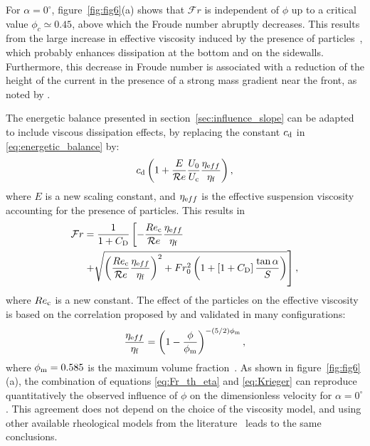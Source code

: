 \documentclass[12pt]{article}
\begin{document}
For $\alpha=0^\circ$, figure~\ref{fig:fig6}(a) shows that $\mathcal{F}r$ is independent of $\phi$ up to a critical value $\phi_{c} \simeq 0.45$, above which the Froude number abruptly decreases. This results from the large increase in effective viscosity induced by the presence of particles~\citep{stickel2005fluid}, which probably enhances dissipation at the bottom and on the sidewalls. Furthermore, this decrease in Froude number is associated with a reduction of the height of the current in the presence of a strong mass gradient near the front, as noted by \citet{Schneider2023}.


The energetic balance presented in section~\ref{sec:influence_slope} can be adapted to include viscous dissipation effects, by replacing the constant $c_{\text d}$ in \eqref{eq:energetic_balance} by:
\begin{equation}
	c_{\text d}\left(1 + \frac{E}{\mathcal{R}e}\frac{U_0}{U_{\text c}}\frac{\eta_{\text eff}}{\eta_{\text f}} \right),
\end{equation}
where $E$ is a new scaling constant, and $\eta_{\text eff}$ is the effective suspension viscosity accounting for the presence of particles. This results in
\begin{equation}
	\label{eq:Fr_th_eta}
	\begin{split}
		\mathcal{F}r & =  \frac{1}{1 + C_{\text D}} \left[-\frac{Re_{\text c}}{\mathcal{R}e}\frac{\eta_{\text eff}}{\eta_{\text f}} \right. \\
		&\left. +\sqrt{\left(\frac{Re_{\text c}}{\mathcal{R}e}\frac{\eta_{\text eff}}{\eta_{\text f}} \right)^{2} + Fr_0^{2} \left(1 + \left[1 + C_{\text D}\right]\frac{\tan\alpha}{S} \right)}  \right],
	\end{split}
\end{equation}
where $Re_{\text c}$ is a new constant. The effect of the particles on the effective viscosity is based on the correlation proposed by \citet{krieger1959mechanism} and validated in many configurations:
\begin{equation}
	\label{eq:Krieger}
	\frac{\eta_{\text eff}}{\eta_{\text f}} = \left(1 - \frac{\phi}{\phi_{\text m}}\right)^{-(5/2)\phi_{\text m}},
\end{equation}
where $\phi_{\text m} = 0.585$ is the maximum volume fraction~\citep{boyer2011unifying}.
%
As shown in figure~\ref{fig:fig6}(a), the combination of equations \eqref{eq:Fr_th_eta} and \eqref{eq:Krieger} can reproduce quantitatively the observed influence of $\phi$ on the dimensionless velocity for $\alpha=0^\circ$. This agreement does not depend on the choice of the viscosity model, and using other available rheological models from the literature~\citep{stickel2005fluid, boyer2011unifying} leads to the same conclusions.
\end{document}
